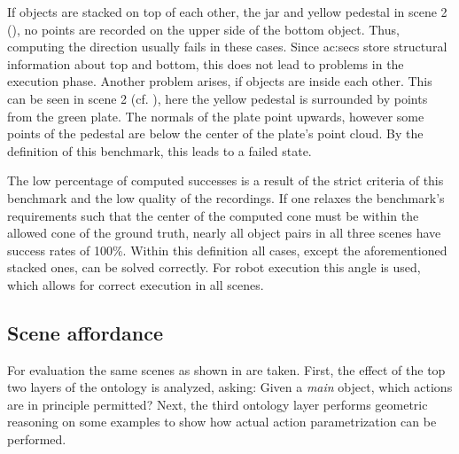 If objects are stacked on top of each other, \eg the jar and yellow pedestal in scene 2 (), no points are recorded on the upper side of the bottom object.
Thus, computing the direction usually fails in these cases.
Since \glspl{ac:sec} store structural information about top and bottom, this does not lead to problems in the execution phase.
Another problem arises, if objects are inside each other.
This can be seen in scene 2 (cf. ), here the yellow pedestal is surrounded by points from the green plate.
The normals of the plate point upwards, however some points of the pedestal are below the center of the plate's point cloud.
By the definition of this benchmark, this leads to a failed state.

The low percentage of computed successes is a result of the strict criteria of this benchmark and the low quality of the recordings.
If one relaxes the benchmark's requirements such that the center of the computed cone must be within the allowed cone of the ground truth, nearly all object pairs in all three scenes have success rates of 100\%.
Within this definition all cases, except the aforementioned stacked ones, can be solved correctly.
For robot execution this angle is used, which allows for correct execution in all scenes.





\subsection{Scene affordance}

For evaluation the same scenes as shown in  are taken.
First, the effect of the top two layers of the ontology is analyzed, asking: Given a \emph{main} object, which actions are in principle permitted?
Next, the third ontology layer performs geometric reasoning on some examples to show how actual action parametrization can be performed.


